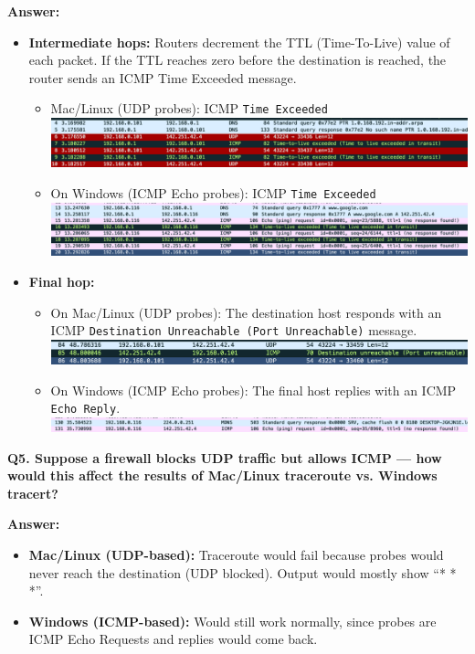 \documentclass[12pt, a4paper]{report}
\begin{document}
\textbf{Answer:}  
\begin{itemize}[leftmargin=*]
    \item \textbf{Intermediate hops:}  Routers decrement the TTL (Time-To-Live) value of each packet. If the TTL reaches zero before the destination is reached, the router sends an ICMP Time Exceeded message.
    \begin{itemize}
        \item Mac/Linux (UDP probes): ICMP \texttt{Time Exceeded}
        \\
        \includegraphics[width=1\linewidth]{images/image copy.png}
        \\
        \item On Windows (ICMP Echo probes): ICMP \texttt{Time Exceeded}
        \\
        \includegraphics[width=1\linewidth]{images/image.png}
        \\
    \end{itemize}
    \item \textbf{Final hop:}  
    \begin{itemize}
        \item On Mac/Linux (UDP probes): The destination host responds with an ICMP \texttt{Destination Unreachable (Port Unreachable)} message.
        \\
        \includegraphics[width=1\linewidth]{images/image copy 3.png}
        \\
        \item On Windows (ICMP Echo probes): The final host replies with an ICMP \texttt{Echo Reply}.
        \\
        \includegraphics[width=1\linewidth]{images/image copy 4.png}
    \end{itemize}
\end{itemize}

\textbf{Q5. Suppose a firewall blocks UDP traffic but allows ICMP — how would this affect the results of Mac/Linux traceroute vs. Windows tracert?}

\textbf{Answer:}  
\begin{itemize}[leftmargin=*]
    \item \textbf{Mac/Linux (UDP-based):} Traceroute would fail because probes would never reach the destination (UDP blocked). Output would mostly show ``* * *''.  
    \item \textbf{Windows (ICMP-based):} Would still work normally, since probes are ICMP Echo Requests and replies would come back.  
\end{itemize}
\end{document}

